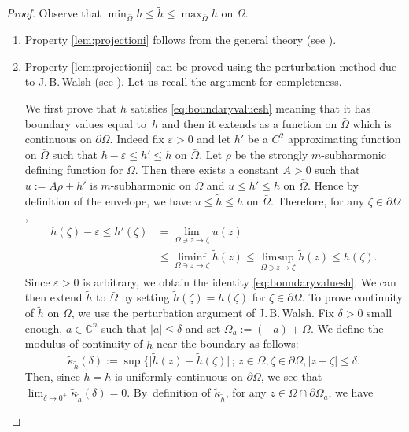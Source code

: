 \documentclass[11pt]{article}
\providecommand{\C}{}
\numberwithin{equation}{section}
\newcommand{\sep}{\,;\,}
\theoremstyle{definition}
\renewcommand{\C}{\mathbb{C}}
\theoremstyle{plain}
\theoremstyle{definition}
\begin{document}
\begin{proof}
Observe that $\min_{\bar \Omega} h \leq \tilde h \leq \max_{\bar \Omega} h$ on $\Omega$.
\begin{enumerate}
\item
Property \eqref{lem:projectioni} follows from the general theory (see \cite{Lu12}).

\item
Property \eqref{lem:projectionii} can be proved using the perturbation method due to J.\,B.\,Walsh (see \cite{Wal69}). Let us recall the argument for completeness.

We first prove that $\tilde h$ satisfies \eqref{eq:boundaryvaluesh} meaning that it has boundary values equal to~$h$ and then it extends as a function on $\bar \Omega$ which is continuous on $\partial \Omega$. Indeed fix $\varepsilon > 0$ and let $h'$ be a $C^2$ approximating function on $\bar \Omega$ such that $h - \varepsilon \leq h' \leq h $ on $\bar \Omega$. Let $\rho$ be the strongly $m$-subharmonic defining function for $\Omega$. Then there exists a constant $A > 0$ such that $u:= A \rho + h'$ is $m$-subharmonic on $\Omega$ and $u \leq h' \leq h$ on $\bar \Omega$. Hence by definition of the envelope, we have $u \leq \tilde h \leq h$ on $\bar \Omega$. Therefore, for any $\zeta \in \partial \Omega$,
\begin{align*}
h (\zeta) - \varepsilon \leq h' (\zeta) & = \lim_{\Omega \ni z \to \zeta } u (z) \\
& \leq \liminf_{\Omega \ni z \to \zeta } \tilde h (z) \leq \limsup_{\Omega \ni z \to \zeta } \tilde h (z) \leq h (\zeta).
\end{align*}
Since $\varepsilon > 0$ is arbitrary, we obtain the identity \eqref{eq:boundaryvaluesh}.
We can then extend $\tilde h$ to $\bar \Omega$ by setting $\tilde h (\zeta) = h (\zeta)$ for $\zeta \in \partial \Omega$. To prove continuity of $\tilde h$ on $\bar \Omega$, we use the perturbation argument of J.\,B.\,Walsh. Fix $\delta > 0$ small enough, $a \in \C^n$ such that $\vert a \vert \leq \delta$ and set $\Omega_a:= (- a) + \Omega$. We define the modulus of continuity of $\tilde{h}$ near the boundary as follows:
\[
\tilde{\kappa}_{\tilde h} (\delta):= \sup \{ \vert \tilde h(z) - \tilde{h} (\zeta)\vert \sep z \in \Omega, \zeta \in \partial \Omega, \vert z - \zeta\vert \leq \delta.
\]
Then, since $\tilde h = h$ is uniformly continuous on $\partial \Omega$, we see that $\lim_{\delta \to 0^+} \tilde{\kappa}_{\tilde h} (\delta) = 0$. By~definition of $\tilde{\kappa}_{\tilde h}$, for any $z \in \Omega \cap \partial \Omega_a$, we have

\end{enumerate}
\end{proof}
\end{document}
